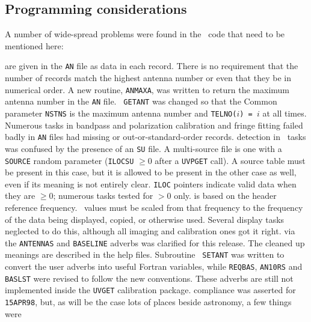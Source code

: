 \subsection{Programming considerations}

A number of wide-spread problems were found in the \AIPS\ code that
need to be mentioned here:

\begin{description}
 \hspace{39pt} are given in the {\tt AN} file
   as data in each record.  There is no requirement that the number of
   records match the highest antenna number or even that they be in
   numerical order.  A new routine, {\tt ANMAXA}, was written to
   return the maximum antenna number in the {\tt AN} file.  {\tt
   GETANT} was changed so that the Common parameter {\tt NSTNS} is the
   maximum antenna number and {\tt TELNO($i$) = $i$} at all times.
   Numerous tasks in bandpass and polarization calibration and fringe
   fitting failed badly in {\tt AN} files had missing or
   out-or-standard-order records.
 \hspace{20pt} detection in \uv\ tasks was
   confused by the presence of an {\tt SU} file.  A multi-source file
   is one with a {\tt SOURCE} random parameter ({\tt ILOCSU} $\geq 0$
   after a {\tt UVPGET} call).  A source table must be present in this
   case, but it is allowed to be present in the other case as well,
   even if its meaning is not entirely clear.  {\tt ILOC} pointers
   indicate valid data when they are $\geq 0$; numerous tasks tested
   for $> 0$ only.
 is based on the header reference frequency.
   \uv\ values must be scaled from that frequency to the frequency of
   the data being displayed, copied, or otherwise used.  Several
   display tasks neglected to do this, although all imaging and
   calibration ones got it right.
 \hspace{35pt} via the {\tt ANTENNAS} and
   {\tt BASELINE} adverbs was clarified for this release.  The cleaned
   up meanings are described in the help files.  Subroutine {\tt
   SETANT} was written to convert the user adverbs into useful Fortran
   variables, while {\tt REQBAS}, {\tt AN10RS} and {\tt BASLST} were
   revised to follow the new conventions.  These adverbs are still not
   implemented inside the {\tt UVGET} calibration package.
 compliance was asserted for {\tt 15APR98}, but, as will
   be the case lots of places beside astronomy, a few things were

\end{description}
